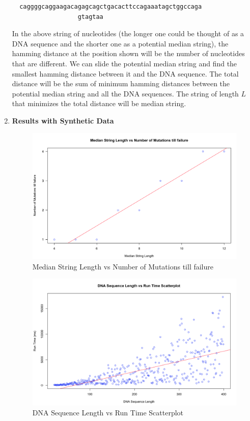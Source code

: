 \documentclass[paper=a4, fontsize=11pt]{scrartcl} %
\numberwithin{equation}{section} %
\numberwithin{figure}{section} %
\numberwithin{table}{section} %
\begin{document}
\begin{enumerate}
\begin{verbatim}  caggggcaggaagacagagcagctgacacttccagaaatagctggccaga
                  gtagtaa\end{verbatim}

In the above string of nucleotides (the longer one could be thought of as a DNA sequence and the shorter one as a potential median string), the hamming distance at the position shown will be the number of nucleotides that are different. We can slide the potential median string and find the smallest hamming distance between it and the DNA sequence. The total distance will be the sum of minimum hamming distances between the potential median string and all the DNA sequences. The string of length $L$ that minimizes the total distance will be median string.
\item \textbf{Results with Synthetic Data}

\begin{figure}[h]
\centering
\includegraphics[width=6.75in]{Figures/MedianStringLenVsMutations.png}
\caption{Median String Length vs Number of Mutations till failure}
\label{MedStrLenVMutations}
\end{figure}

\begin{figure}[h]
\centering
\includegraphics[width=6.75in]{Figures/DNASeqLengthVsRunTimeScatterplot.png}
\caption{DNA Sequence Length vs Run Time Scatterplot}
\label{SeqLenVRunTime}
\end{figure}


\end{enumerate}
\end{document}
